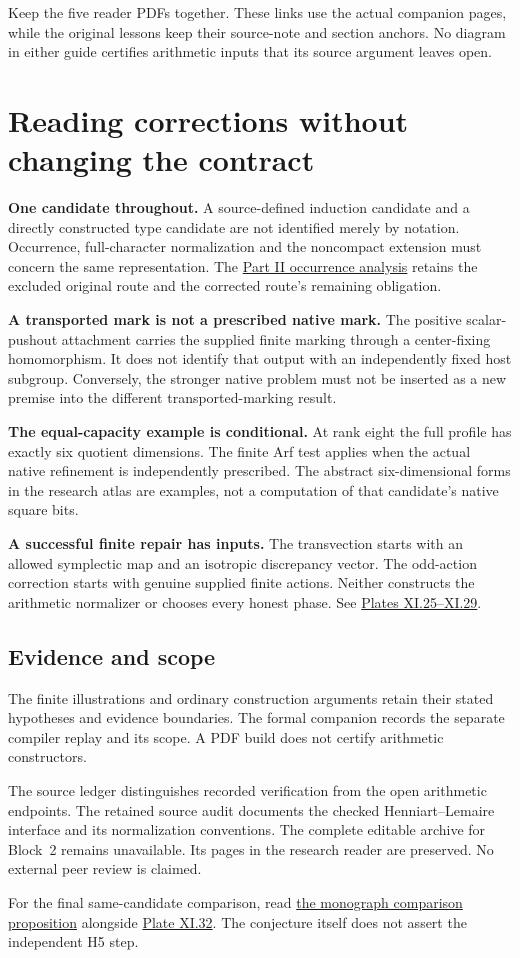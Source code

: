Keep the five reader PDFs together. These links use the actual companion pages, while the original lessons keep their source-note and section anchors. No diagram in either guide certifies arithmetic inputs that its source argument leaves open.
\clearpage
\section*{Reading corrections without changing the contract}
{}
\textbf{One candidate throughout.} A source-defined induction candidate and a directly constructed type candidate are not identified merely by notation. Occurrence, full-character normalization and the noncompact extension must concern the same representation. The \href{https://komorebi.invalid/b07/visual_occurrence}{Part II occurrence analysis} retains the excluded original route and the corrected route's remaining obligation.

\textbf{A transported mark is not a prescribed native mark.} The positive scalar-pushout attachment carries the supplied finite marking through a center-fixing homomorphism. It does not identify that output with an independently fixed host subgroup. Conversely, the stronger native problem must not be inserted as a new premise into the different transported-marking result.

\textbf{The equal-capacity example is conditional.} At rank eight the full profile has exactly six quotient dimensions. The finite Arf test applies when the actual native refinement is independently prescribed. The abstract six-dimensional forms in the research atlas are examples, not a computation of that candidate's native square bits.

\textbf{A successful finite repair has inputs.} The transvection starts with an allowed symplectic map and an isotropic discrepancy vector. The odd-action correction starts with genuine supplied finite actions. Neither constructs the arithmetic normalizer or chooses every honest phase. See \href{https://komorebi.invalid/b07/visual_repairs}{Plates XI.25--XI.29}.

\subsection*{Evidence and scope}
The finite illustrations and ordinary construction arguments retain their stated hypotheses and evidence boundaries. The formal companion records the separate compiler replay and its scope. A PDF build does not certify arithmetic constructors.

The source ledger distinguishes recorded verification from the open arithmetic endpoints. The retained source audit documents the checked Henniart--Lemaire interface and its normalization conventions. The complete editable archive for Block~2 remains unavailable. Its pages in the research reader are preserved. No external peer review is claimed.

For the final same-candidate comparison, read \href{https://komorebi.invalid/b07/visual_comparison}{the monograph comparison proposition} alongside \href{https://komorebi.invalid/b07/visual_v32}{Plate XI.32}. The conjecture itself does not assert the independent H5 step.
